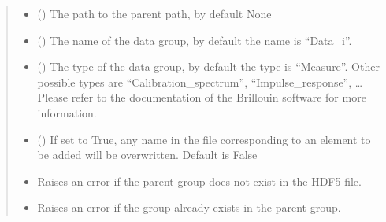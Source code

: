 \documentclass[letterpaper,10pt,english]{sphinxmanual}
\begin{document}
\begin{fulllineitems}
\begin{fulllineitems}
\begin{quote}
\begin{description}
\begin{itemize}
\item {} 
\sphinxAtStartPar
{} (\sphinxstyleliteralemphasis{\sphinxupquote{, }}) \textendash{} The path to the parent path, by default None

\item {} 
\sphinxAtStartPar
{} (\sphinxstyleliteralemphasis{\sphinxupquote{, }}) \textendash{} The name of the data group, by default the name is “Data\_i”.

\item {} 
\sphinxAtStartPar
{} (\sphinxstyleliteralemphasis{\sphinxupquote{, }}) \textendash{} The type of the data group, by default the type is “Measure”. Other possible types are “Calibration\_spectrum”, “Impulse\_response”, … Please refer to the documentation of the Brillouin software for more information.

\item {} 
\sphinxAtStartPar
{} (\sphinxstyleliteralemphasis{\sphinxupquote{, }}) \textendash{} If set to True, any name in the file corresponding to an element to be added will be overwritten. Default is False

\end{itemize}

\begin{itemize}
\item {} 
\sphinxAtStartPar
{\hyperref[\detokenize{source/_autosummary/HDF5_BLS.errors:HDF5_BLS.errors.WrapperError_StructureError}]{}} \textendash{} Raises an error if the parent group does not exist in the HDF5 file.

\item {} 
\sphinxAtStartPar
{\hyperref[\detokenize{source/_autosummary/HDF5_BLS.errors:HDF5_BLS.errors.WrapperError_Overwrite}]{}} \textendash{} Raises an error if the group already exists in the parent group.


\end{itemize}
\end{description}
\end{quote}
\end{fulllineitems}
\end{fulllineitems}
\end{document}
